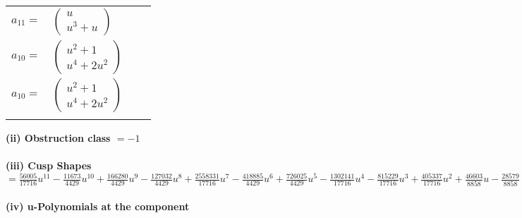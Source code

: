 \documentclass[1p]{elsarticle_modified}
\theoremstyle{definition}
\begin{document}
\begin{tabular}{m{7pt} m{180pt} m{7pt} m{180pt} }
\flushright $a_{11}=$&$\begin{pmatrix}u\\u^3+u\end{pmatrix}$ \\
\flushright $a_{10}=$&$\begin{pmatrix}u^2+1\\u^4+2 u^2\end{pmatrix}$\\ \flushright $a_{10}=$&$\begin{pmatrix}u^2+1\\u^4+2 u^2\end{pmatrix}$\\&\end{tabular}
\flushleft \textbf{(ii) Obstruction class $= -1$}\\~\\
\flushleft \textbf{(iii) Cusp Shapes $= \frac{56005}{17716} u^{11}-\frac{11673}{4429} u^{10}+\frac{166280}{4429} u^9-\frac{127032}{4429} u^8+\frac{2558331}{17716} u^7-\frac{418885}{4429} u^6+\frac{726025}{4429} u^5-\frac{1302141}{17716} u^4-\frac{815229}{17716} u^3+\frac{405337}{17716} u^2+\frac{46603}{8858} u-\frac{28579}{8858}$}\\~\\
\newpage\renewcommand{\arraystretch}{1}
\flushleft \textbf{(iv) u-Polynomials at the component}\newline \\
\end{document}
